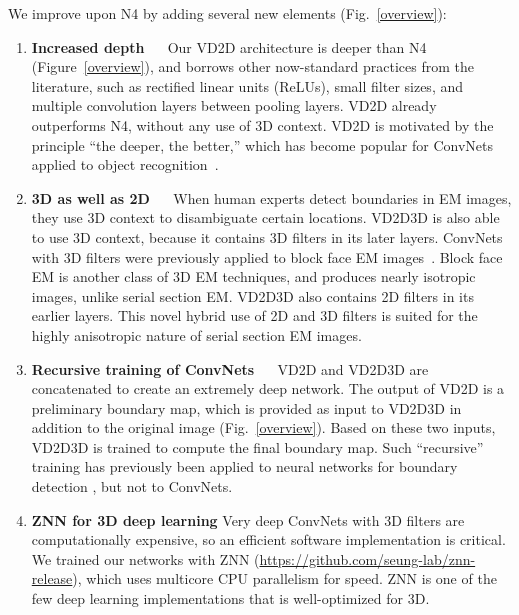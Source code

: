 \documentclass{article} %
\begin{document}
We improve upon N4 by adding several new elements (Fig.~\ref{overview}):
\begin{enumerate}[]
\item{\bf Increased depth} $\quad$  Our VD2D architecture is deeper than N4 (Figure~\ref{overview}), and borrows other now-standard practices from the literature, such as rectified linear units (ReLUs), small filter sizes, and multiple convolution layers between pooling layers.  VD2D already outperforms N4, without any use of 3D context. VD2D is motivated by the principle ``the deeper, the better,'' which has become popular for ConvNets applied to object recognition~\cite{Krizhevsky2012,Simonyan2015,He2015}.
\item{\bf 3D as well as 2D} $\quad$ When human experts detect boundaries in EM images, they use 3D context to disambiguate certain locations. VD2D3D is also able to use 3D context, because it contains 3D filters in its later layers. ConvNets with 3D filters were previously applied to block face EM images~\cite{Helmstaedter2013,Kim2014,Turaga2010}. Block face EM is another class of 3D EM techniques, and produces nearly isotropic images, unlike serial section EM.  VD2D3D also contains 2D filters in its earlier layers. This novel hybrid use of 2D and 3D filters is suited for the highly anisotropic nature of serial section EM images.
\item{\bf Recursive training of ConvNets} $\quad$ VD2D and VD2D3D are concatenated to create an extremely deep network. The output of VD2D is a preliminary boundary map, which is provided as input to VD2D3D in addition to the original image (Fig.~\ref{overview}). Based on these two inputs, VD2D3D is trained to compute the final boundary map.  Such ``recursive'' training has previously been applied to neural networks for boundary detection \cite{Jurrus2010,Huang2014,Seyedhosseini2013}, but not to ConvNets.
\item{\bf ZNN for 3D deep learning} Very deep ConvNets with
  3D filters are computationally expensive, so an efficient software
  implementation is critical.  We trained our networks with ZNN (\url{https://github.com/seung-lab/znn-release}), which uses multicore CPU parallelism for speed. ZNN is one of the few deep learning implementations that is well-optimized for 3D.


\end{enumerate}
\end{document}

